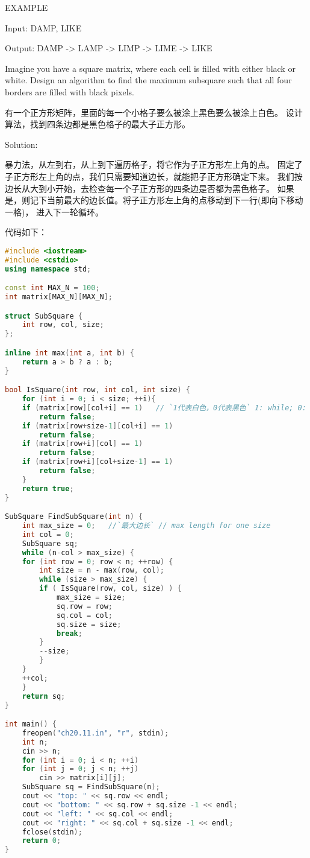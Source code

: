 \begin{description}
EXAMPLE

Input: DAMP, LIKE

Output: DAMP -> LAMP -> LIMP -> LIME -> LIKE
%


\item[20.11] Imagine you have a square matrix, where each cell is filled with either black or white. Design an algorithm to find the maximum subsquare such that all four borders are filled with black pixels.

有一个正方形矩阵，里面的每一个小格子要么被涂上黑色要么被涂上白色。 设计算法，找到四条边都是黑色格子的最大子正方形。

Solution:

暴力法，从左到右，从上到下遍历格子，将它作为子正方形左上角的点。 固定了子正方形左上角的点，我们只需要知道边长，就能把子正方形确定下来。 我们按边长从大到小开始，去检查每一个子正方形的四条边是否都为黑色格子。 如果是，则记下当前最大的边长值。将子正方形左上角的点移动到下一行(即向下移动一格)， 进入下一轮循环。

代码如下：
\begin{lstlisting}[language=C++]
#include <iostream>
#include <cstdio>
using namespace std;

const int MAX_N = 100;
int matrix[MAX_N][MAX_N];

struct SubSquare {
    int row, col, size;
};

inline int max(int a, int b) {
    return a > b ? a : b;
}

bool IsSquare(int row, int col, int size) {
    for (int i = 0; i < size; ++i){
	if (matrix[row][col+i] == 1)   // `1代表白色，0代表黑色` 1: while; 0: black
	    return false;
	if (matrix[row+size-1][col+i] == 1)
	    return false;
	if (matrix[row+i][col] == 1)
	    return false;
	if (matrix[row+i][col+size-1] == 1)
	    return false;
    }
    return true;
}

SubSquare FindSubSquare(int n) {
    int max_size = 0;   //`最大边长` // max length for one size
    int col = 0;
    SubSquare sq;
    while (n-col > max_size) {
	for (int row = 0; row < n; ++row) {
	    int size = n - max(row, col);
	    while (size > max_size) {
		if ( IsSquare(row, col, size) ) {
		    max_size = size;
		    sq.row = row; 
		    sq.col = col;
		    sq.size = size;
		    break;
		}
		--size;
	    }
	}
	++col;
    }
    return sq;
}

int main() {
    freopen("ch20.11.in", "r", stdin);
    int n;
    cin >> n;
    for (int i = 0; i < n; ++i) 
	for (int j = 0; j < n; ++j)
	    cin >> matrix[i][j];
    SubSquare sq = FindSubSquare(n);
    cout << "top: " << sq.row << endl;
    cout << "bottom: " << sq.row + sq.size -1 << endl;
    cout << "left: " << sq.col << endl;
    cout << "right: " << sq.col + sq.size -1 << endl;
    fclose(stdin);
    return 0;
}
\end{lstlisting}
%



\end{description}
